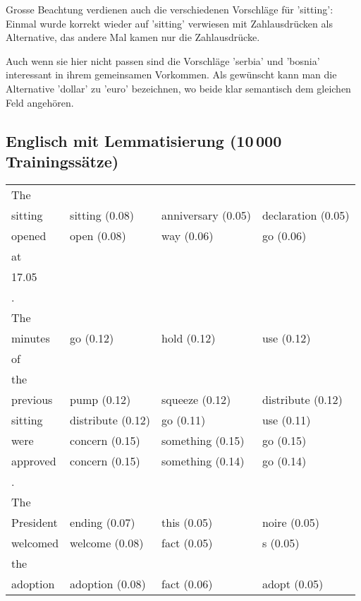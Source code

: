 \documentclass[11pt,twoside,openright]{mpreport}
\begin{document}
Grosse Beachtung verdienen auch die verschiedenen Vorschläge für 'sitting': Einmal wurde korrekt wieder auf 'sitting' verwiesen mit Zahlausdrücken als Alternative, das andere Mal kamen nur die Zahlausdrücke.

Auch wenn sie hier nicht passen sind die Vorschläge 'serbia' und 'bosnia' interessant in ihrem gemeinsamen Vorkommen. Als gewünscht kann man die Alternative 'dollar' zu 'euro' bezeichnen, wo beide klar semantisch dem gleichen Feld angehören.

\subsection{Englisch mit Lemmatisierung (10\,000 Trainingssätze)}
\hspace{-0cm}\begin{footnotesize}\begin{tabular}{|llll|}
\hline
The & & & \\
sitting                 & sitting (0.08) & anniversary (0.05) & declaration (0.05) \\
opened                  & open (0.08) & way (0.06) & go (0.06) \\
at & & & \\
17.05 & & & \\
. & & & \\
The & & & \\
minutes                 & go (0.12) & hold (0.12) & use (0.12) \\
of & & & \\
the & & & \\
previous                & pump (0.12) & squeeze (0.12) & distribute (0.12) \\
sitting                 & distribute (0.12) & go (0.11) & use (0.11) \\
were                    & concern (0.15) & something (0.15) & go (0.15) \\
approved                & concern (0.15) & something (0.14) & go (0.14) \\
. & & & \\
The & & & \\
President               & ending (0.07) & this (0.05) & noire (0.05) \\
welcomed                & welcome (0.08) & fact (0.05) & s (0.05) \\
the & & & \\
adoption                & adoption (0.08) & fact (0.06) & adopt (0.05) \\

\end{tabular}
\end{footnotesize}
\end{document}
